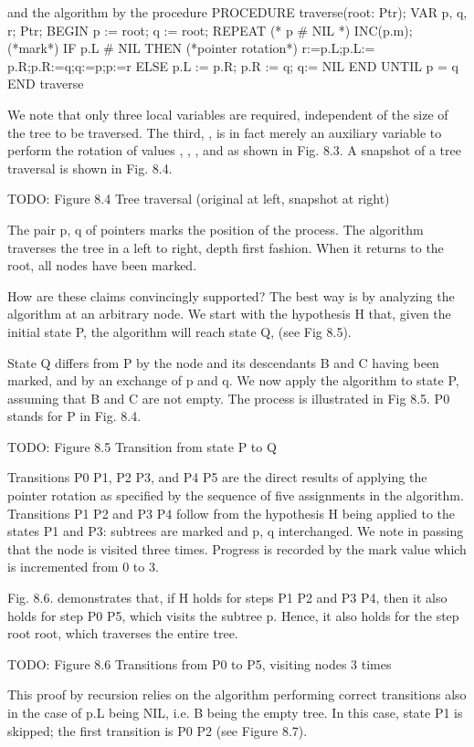 \noindent and the algorithm by the procedure
\begintt
PROCEDURE traverse(root: Ptr); VAR p, q, r; Ptr;
BEGIN p := root; q := root;
REPEAT (* p # NIL *) INC(p.m); (*mark*)
IF p.L # NIL THEN (*pointer rotation*) r:=p.L;p.L:= p.R;p.R:=q;q:=p;p:=r
ELSE
p.L := p.R; p.R := q; q:= NIL
END UNTIL p = q
END traverse
\endtt

\noindent We note that only three local variables are required, independent of the size of the tree to be traversed. The third, , is in fact merely an auxiliary variable to perform the rotation of values , , , and  as shown in Fig. 8.3. A snapshot of a tree traversal is shown in Fig. 8.4.

TODO: Figure 8.4 Tree traversal (original at left, snapshot at right)


The pair p, q of pointers marks the position of the process. The algorithm traverses the tree in a left to right, depth first fashion. When it returns to the root, all nodes have been marked.

How are these claims convincingly supported? The best way is by analyzing the algorithm at an arbitrary node. We start with the hypothesis H that, given the initial state P, the algorithm will reach state Q, (see Fig 8.5).

State Q differs from P by the node and its descendants B and C having been marked, and by an exchange of p and q. We now apply the algorithm to state P, assuming that B and C are not empty. The process is illustrated in Fig 8.5. P0 stands for P in Fig. 8.4.

TODO: Figure 8.5 Transition from state P to Q

Transitions P0 \to P1, P2 \to P3, and P4 \to P5 are the direct results of applying the pointer rotation as specified by the sequence of five assignments in the algorithm. Transitions P1 \to P2 and P3 \to P4 follow from the hypothesis H being applied to the states P1 and P3: subtrees are marked and p, q interchanged. We note in passing that the node is visited three times. Progress is recorded by the mark value which is incremented from 0 to 3.

Fig. 8.6. demonstrates that, if H holds for steps P1 \to P2 and P3 \to P4, then it also holds for step P0 \to P5, which visits the subtree p. Hence, it also holds for the step root \to root, which traverses the entire tree.

TODO: Figure 8.6 Transitions from P0 to P5, visiting nodes 3 times

This proof by recursion relies on the algorithm performing correct transitions also in the case of p.L being NIL, i.e. B being the empty tree. In this case, state P1 is skipped; the first transition is P0 \to P2 (see Figure 8.7).

